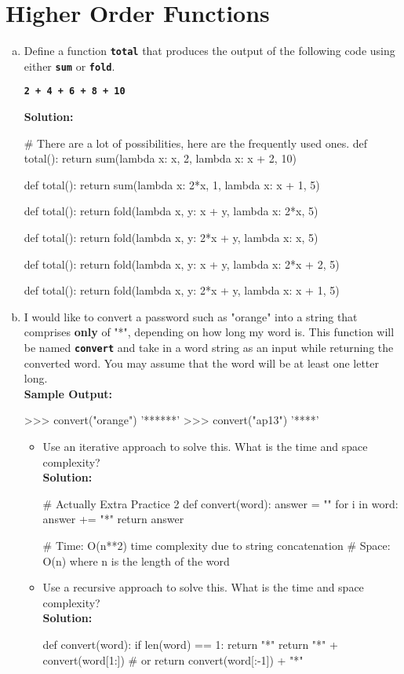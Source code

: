 \section{Higher Order Functions}
\begin{enumerate}[(a)]
\item Define a function \texttt{\bfseries total} that produces the output of the following code using either
\texttt{\bfseries sum} or \texttt{\bfseries fold}.
\begin{center}
\texttt{\bfseries 2 + 4 + 6 + 8 + 10}
\end{center}
\textbf{Solution:}
\begin{python}
# There are a lot of possibilities, here are the frequently used ones.
def total():
    return sum(lambda x: x, 2, lambda x: x + 2, 10)

def total():
    return sum(lambda x: 2*x, 1, lambda x: x + 1, 5)

def total():
    return fold(lambda x, y: x + y, lambda x: 2*x, 5)

def total():
    return fold(lambda x, y: 2*x + y, lambda x: x, 5)

def total():
    return fold(lambda x, y: x + y, lambda x: 2*x + 2, 5)

def total():
    return fold(lambda x, y: 2*x + y, lambda x: x + 1, 5)
\end{python}

\item I would like to convert a password such as "orange" into a string that comprises \textbf{only} of
"*", depending on how long my word is. This function will be named \texttt{\bfseries convert} and
take in a word string as an input while returning the converted word. You may assume
that the word will be at least one letter long. \\
\textbf{Sample Output:}
\begin{python}
>>> convert("orange")
'******'
>>> convert("ap13")
'****'
\end{python}
\begin{itemize}
\item Use an iterative approach to solve this. What is the time and space complexity? \\
\textbf{Solution:}
\begin{python}
# Actually Extra Practice 2
def convert(word):
    answer = ""
    for i in word:
        answer += "*"
    return answer

# Time: O(n**2) time complexity due to string concatenation
# Space: O(n) where n is the length of the word
\end{python}
\item Use a recursive approach to solve this. What is the time and space complexity? \\
\textbf{Solution:}
\begin{python}
def convert(word):
    if len(word) == 1:
        return "*"
    return "*" + convert(word[1:])
    # or return convert(word[:-1]) + "*"


\end{python}
\end{itemize}
\end{enumerate}
